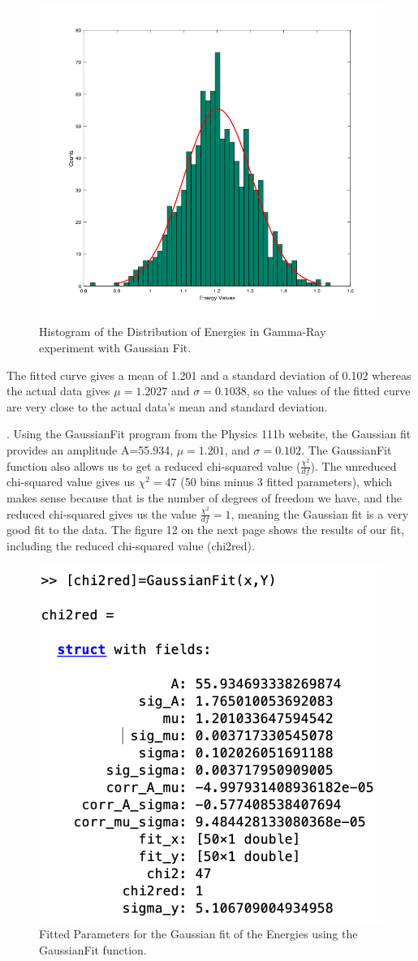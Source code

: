 \documentclass{article}
\begin{document}
\begin{figure}[H]
  \centering
  \includegraphics[width=0.8\linewidth]{lateximages/Prob5_3.png}
  \caption{Histogram of the Distribution of Energies in Gamma-Ray experiment with Gaussian Fit.}
  \label{fig:boat2}
  \end{figure}
  
  The fitted curve gives a mean of 1.201 and a standard deviation of 0.102 whereas the actual data gives $\mu=1.2027$ and $\sigma=0.1038$, so the values of the fitted curve are very close to the actual data's mean and standard deviation.  \newline
  
. Using the GaussianFit program from the Physics 111b website, the Gaussian fit provides an amplitude A=55.934, $\mu=1.201$, and $\sigma=0.102$. The GaussianFit function also allows us to get a reduced chi-squared value ($\frac{\chi^2}{df}$). The unreduced chi-squared value gives us $\chi^2=47$ (50 bins minus 3 fitted parameters), which makes sense because that is the number of degrees of freedom we have, and the reduced chi-squared gives us the value $\frac{\chi^2}{df}=1$, meaning the Gaussian fit is a very good fit to the data. The figure 12 on the next page shows the results of our fit, including the reduced chi-squared value (chi2red). 

\begin{figure}[H]
  \centering
  \includegraphics[width=0.5\linewidth]{lateximages/Prob5_4.png}
  \caption{Fitted Parameters for the Gaussian fit of the Energies using the GaussianFit function.}
  \label{fig:boat2}
  \end{figure}
\end{document}
